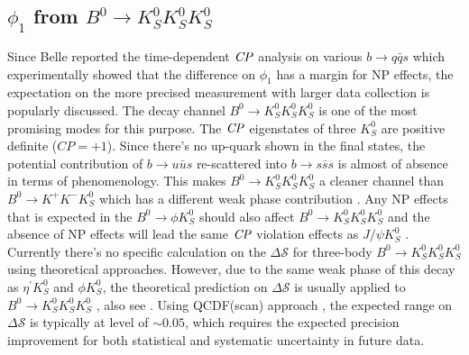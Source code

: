 \subsection{$\phi_1$ from $B^0 \to K_S^0  K_S^0  K_S^0$}%
Since Belle reported the time-dependent $\it{CP}$ analysis on various $b\to q\bar{q}s$ which experimentally showed that the difference on $\phi_1$ has a margin for NP effects\cite{chen2007observation}, the expectation on the more precised measurement with larger data collection is popularly discussed. The decay channel $B^0 \to K_S^0  K_S^0  K_S^0$ is one of the most promising modes for this purpose. The $\it{CP}$ eigenstates of three $K_S^0$ are positive definite ($CP=+1$). Since there's no up-quark shown in the final states, the potential contribution of $b\to u\bar{u}s$ re-scattered into $b\to s\bar{s}s$ is almost of absence in terms of phenomenology. This makes $B^0 \to K_S^0  K_S^0  K_S^0$ a cleaner channel than $B^0 \to K^+  K^-  K_S^0$ which has a different weak phase contribution \cite{gershon2004time}. Any NP effects that is expected in the $B^0 \to \phi K^0_S$ should also affect $B^0 \to K_S^0  K_S^0  K_S^0$ and the absence of NP effects will lead the same $\it{CP}$ violation effects as $J/\psi K^0_S$ \cite{gershon2004time}. Currently there's no specific calculation on the $\Delta \mathcal{S}$ for three-body $B^0 \to K_S^0  K_S^0  K_S^0$ using theoretical approaches. However, due to the same weak phase of this decay as $\eta^{'} K^0_S$ and $\phi K^0_S$, the theoretical prediction on $\Delta \mathcal{S}$ is usually applied to $B^0 \to K_S^0  K_S^0  K_S^0$ , also see \cite{gershon2004time}. Using QCDF(scan) approach \cite{beneke2005corrections}, the expected range on $\Delta \mathcal{S}$ is typically at level of  $\sim 0.05$, which requires the expected precision improvement for both statistical and systematic uncertainty in future data.
